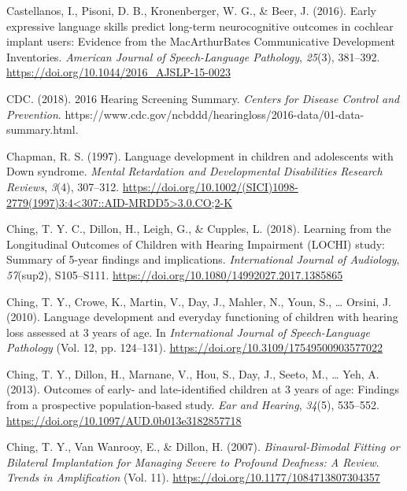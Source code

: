 \documentclass[english,man]{apa6}
\begin{document}
\leavevmode\hypertarget{ref-castellanos2016}{}%
Castellanos, I., Pisoni, D. B., Kronenberger, W. G., \& Beer, J. (2016). Early expressive language skills predict long-term neurocognitive outcomes in cochlear implant users: Evidence from the MacArthurBates Communicative Development Inventories. \emph{American Journal of Speech-Language Pathology}, \emph{25}(3), 381--392. \url{https://doi.org/10.1044/2016_AJSLP-15-0023}

\leavevmode\hypertarget{ref-cdc2018}{}%
CDC. (2018). 2016 Hearing Screening Summary. \emph{Centers for Disease Control and Prevention}. https://www.cdc.gov/ncbddd/hearingloss/2016-data/01-data-summary.html.

\leavevmode\hypertarget{ref-chapman1997}{}%
Chapman, R. S. (1997). Language development in children and adolescents with Down syndrome. \emph{Mental Retardation and Developmental Disabilities Research Reviews}, \emph{3}(4), 307--312. \href{https://doi.org/10.1002/(SICI)1098-2779(1997)3:4\%3C307::AID-MRDD5\%3E3.0.CO;2-K}{https://doi.org/10.1002/(SICI)1098-2779(1997)3:4\textless{}307::AID-MRDD5\textgreater{}3.0.CO;2-K}

\leavevmode\hypertarget{ref-ching2018}{}%
Ching, T. Y. C., Dillon, H., Leigh, G., \& Cupples, L. (2018). Learning from the Longitudinal Outcomes of Children with Hearing Impairment (LOCHI) study: Summary of 5-year findings and implications. \emph{International Journal of Audiology}, \emph{57}(sup2), S105--S111. \url{https://doi.org/10.1080/14992027.2017.1385865}

\leavevmode\hypertarget{ref-ching2010}{}%
Ching, T. Y., Crowe, K., Martin, V., Day, J., Mahler, N., Youn, S., \ldots{} Orsini, J. (2010). Language development and everyday functioning of children with hearing loss assessed at 3 years of age. In \emph{International Journal of Speech-Language Pathology} (Vol. 12, pp. 124--131). \url{https://doi.org/10.3109/17549500903577022}

\leavevmode\hypertarget{ref-ching2013}{}%
Ching, T. Y., Dillon, H., Marnane, V., Hou, S., Day, J., Seeto, M., \ldots{} Yeh, A. (2013). Outcomes of early- and late-identified children at 3 years of age: Findings from a prospective population-based study. \emph{Ear and Hearing}, \emph{34}(5), 535--552. \url{https://doi.org/10.1097/AUD.0b013e3182857718}

\leavevmode\hypertarget{ref-ching2007}{}%
Ching, T. Y., Van Wanrooy, E., \& Dillon, H. (2007). \emph{Binaural-Bimodal Fitting or Bilateral Implantation for Managing Severe to Profound Deafness: A Review}. \emph{Trends in Amplification} (Vol. 11). \url{https://doi.org/10.1177/1084713807304357}
\end{document}
